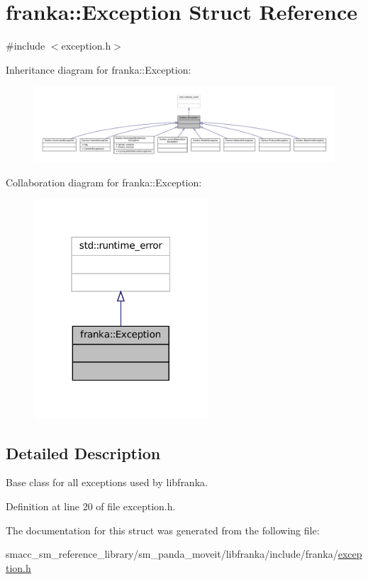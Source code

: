 \hypertarget{structfranka_1_1Exception}{}\section{franka\+:\+:Exception Struct Reference}
\label{structfranka_1_1Exception}


{\ttfamily \#include $<$exception.\+h$>$}



Inheritance diagram for franka\+:\+:Exception\+:
\nopagebreak
\begin{figure}[H]
\begin{center}
\leavevmode
\includegraphics[width=350pt]{structfranka_1_1Exception__inherit__graph}
\end{center}
\end{figure}


Collaboration diagram for franka\+:\+:Exception\+:
\nopagebreak
\begin{figure}[H]
\begin{center}
\leavevmode
\includegraphics[width=184pt]{structfranka_1_1Exception__coll__graph}
\end{center}
\end{figure}


\subsection{Detailed Description}
Base class for all exceptions used by {\ttfamily libfranka}. 

Definition at line 20 of file exception.\+h.



The documentation for this struct was generated from the following file\+:\begin{DoxyCompactItemize}
\item 
smacc\+\_\+sm\+\_\+reference\+\_\+library/sm\+\_\+panda\+\_\+moveit/libfranka/include/franka/\hyperlink{exception_8h}{exception.\+h}\end{DoxyCompactItemize}
